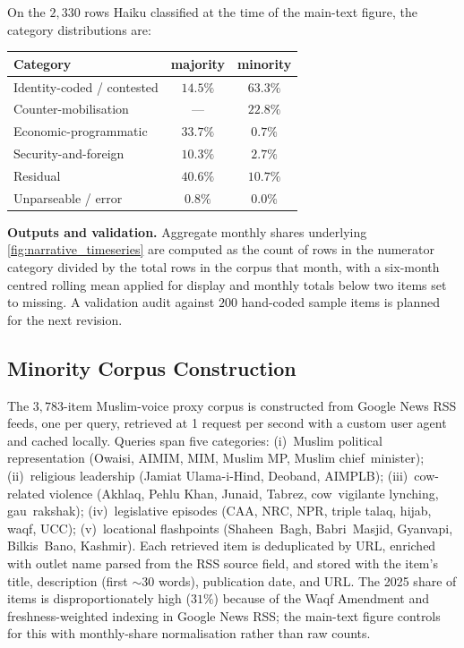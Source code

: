 \documentclass[11pt,twoside]{extarticle}
\begin{document}
On the $2{,}330$ rows Haiku classified at the time of the main-text figure,
the category distributions are:
\begin{center}
\footnotesize
\begin{tabular}{lcc}
\toprule
Category & majority & minority \\
\midrule
Identity-coded / contested & $14.5\%$ & $63.3\%$ \\
Counter-mobilisation & --- & $22.8\%$ \\
Economic-programmatic & $33.7\%$ & $0.7\%$ \\
Security-and-foreign & $10.3\%$ & $2.7\%$ \\
Residual & $40.6\%$ & $10.7\%$ \\
Unparseable / error & $0.8\%$ & $0.0\%$ \\
\bottomrule
\end{tabular}
\end{center}

\textbf{Outputs and validation.} Aggregate monthly shares
underlying \autoref{fig:narrative_timeseries} are computed as the count of
rows in the numerator category divided by the total rows in the corpus that
month, with a six-month centred rolling mean applied for display and
monthly totals below two items set to missing. A validation audit against
$200$ hand-coded sample items is planned for the next revision.

\subsection{Minority Corpus Construction} \label{app:minority_corpus}

The $3{,}783$-item Muslim-voice proxy corpus is constructed from Google News
RSS feeds, one per query, retrieved at 1 request per second with a custom
user agent and cached locally. Queries span five categories: (i)~Muslim
political representation (Owaisi, AIMIM, MIM, Muslim MP, Muslim
chief~minister); (ii)~religious leadership (Jamiat Ulama-i-Hind, Deoband,
AIMPLB); (iii)~cow-related violence (Akhlaq, Pehlu Khan, Junaid, Tabrez,
cow~vigilante lynching, gau~rakshak); (iv)~legislative episodes (CAA,
NRC, NPR, triple talaq, hijab, waqf, UCC); (v)~locational flashpoints
(Shaheen~Bagh, Babri~Masjid, Gyanvapi, Bilkis~Bano, Kashmir). Each retrieved
item is deduplicated by URL, enriched with outlet name parsed from the RSS
source field, and stored with the item's title, description (first $\sim$30
words), publication date, and URL. The 2025 share of items is
disproportionately high ($31\%$) because of the Waqf Amendment and
freshness-weighted indexing in Google News RSS; the main-text figure
controls for this with monthly-share normalisation rather than raw counts.
\end{document}
